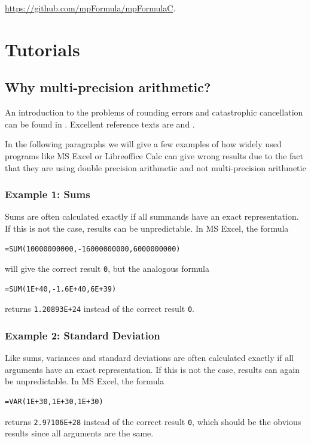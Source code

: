 \href{https://github.com/mpFormula/mpFormulaC}{https://github.com/mpFormula/mpFormulaC}. 









\chapter{Tutorials}
\label{Tutorials} 

\section{Why multi-precision arithmetic?}
\label{Why multiprecision arithmetic}

An introduction to the problems of rounding errors and catastrophic cancellation can be found in \cite{Goldberg91whatevery}. Excellent reference texts are  \cite{Higham2002} and \cite{Higham2009}.

In the following paragraphs we will give a few examples of how widely used programs like MS Excel or Libreoffice Calc can give wrong results due to the fact that they are using double precision arithmetic and not multi-precision arithmetic

\subsection{Example 1: Sums}

Sums are often calculated exactly if all summands have an exact representation. If this is not the case, results can be unpredictable. In MS Excel, the formula

\begin{verbatim}
=SUM(10000000000,-16000000000,6000000000)
\end{verbatim}
 will give the correct result  \verb|0|, but the analogous formula
 \begin{verbatim}
=SUM(1E+40,-1.6E+40,6E+39)
 \end{verbatim}
returns \verb|1.20893E+24| instead of the correct result \verb|0|.

\subsection{Example 2: Standard Deviation}
Like sums, variances and standard deviations are often calculated exactly if all arguments have an exact representation. If this is not the case, results can again be unpredictable. In MS Excel, the formula
 \begin{verbatim}
=VAR(1E+30,1E+30,1E+30)
 \end{verbatim}
returns \verb|2.97106E+28| instead of the correct result \verb|0|, which should be the obvious results since all arguments are the same.


